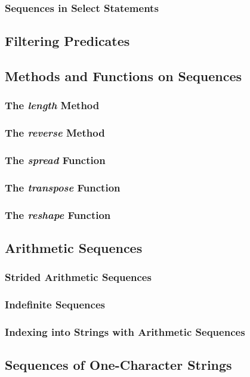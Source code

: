 \documentclass[10pt,twoside,titlepage]{article}
\begin{document}
\subsubsection{Sequences in Select Statements}
\subsection{Filtering Predicates}
\subsection{Methods and Functions on Sequences}
\subsubsection{The {\em length} Method}
\subsubsection{The {\em reverse} Method}
\subsubsection{The {\em spread} Function}
\subsubsection{The {\em transpose} Function}
\subsubsection{The {\em reshape} Function}
\subsection{Arithmetic Sequences}
\subsubsection{Strided Arithmetic Sequences}
\subsubsection{Indefinite Sequences}
\subsubsection{Indexing into Strings with Arithmetic Sequences}
\subsection{Sequences of One-Character Strings}
\end{document}
